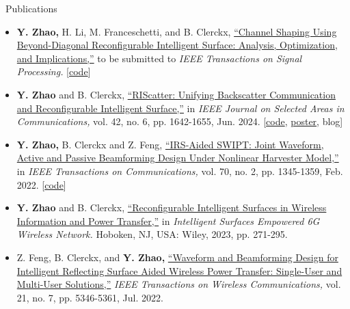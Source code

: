 \documentclass{cv}
\begin{document}
\begin{section}{\faPencil\ Publications}
	\begin{itemize}
		\item \textbf{Y. Zhao,} H. Li, M. Franceschetti, and B. Clerckx, \href{}{``Channel Shaping Using Beyond-Diagonal Reconfigurable Intelligent Surface: Analysis, Optimization, and Implications,''} to be submitted to \emph{IEEE Transactions on Signal Processing.} [\href{https://github.com/snowztail/channel-shaping/}{code}]
		\item \textbf{Y. Zhao} and B. Clerckx, \href{https://ieeexplore.ieee.org/document/10500436}{``RIScatter: Unifying Backscatter Communication and Reconfigurable Intelligent Surface,''} in \emph{IEEE Journal on Selected Areas in Communications,} vol. 42, no. 6, pp. 1642-1655, Jun. 2024. [\href{https://github.com/snowztail/riscatter-unifying-backscatter-communication-and-reconfigurable-intelligent-surface/tree/master/src}{code}, \href{https://github.com/snowztail/riscatter-unifying-backscatter-communication-and-reconfigurable-intelligent-surface/blob/master/poster/beamer.pdf}{poster}, blog]
		\item \textbf{Y. Zhao,} B. Clerckx and Z. Feng, \href{https://ieeexplore.ieee.org/document/9623452}{``IRS-Aided SWIPT: Joint Waveform, Active and Passive Beamforming Design Under Nonlinear Harvester Model,''} in \emph{IEEE Transactions on Communications,} vol. 70, no. 2, pp. 1345-1359, Feb. 2022. [\href{https://github.com/snowztail/irs-aided-swipt-joint-waveform-active-and-passive-beamforming-design-under-nonlinear-harvester-model/tree/master/src/}{code}]
		\item \textbf{Y. Zhao} and B. Clerckx, \href{https://onlinelibrary.wiley.com/doi/abs/10.1002/9781119913122.ch13}{``Reconfigurable Intelligent Surfaces in Wireless Information and Power Transfer,''} in \emph{Intelligent Surfaces Empowered 6G Wireless Network.} Hoboken, NJ, USA: Wiley, 2023, pp. 271-295.
		\item Z. Feng, B. Clerckx, and \textbf{Y. Zhao,} \href{https://ieeexplore.ieee.org/document/9676462}{``Waveform and Beamforming Design for Intelligent Reflecting Surface Aided Wireless Power Transfer: Single-User and Multi-User Solutions,''} \emph{IEEE Transactions on Wireless Communications,} vol. 21, no. 7, pp. 5346-5361, Jul. 2022.
	\end{itemize}
\end{section}

\vspace{-1em}
\end{document}

